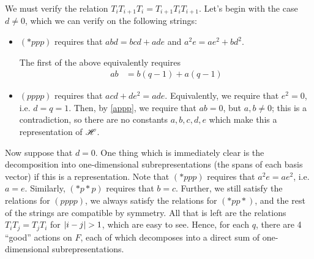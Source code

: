 \documentclass{amsart}
\begin{document}
We must verify the relation $T_iT_{i+1}T_i = T_{i+1}T_iT_{i+1}$.
Let's begin with the case $d \neq 0$, which we can verify on the following strings:
\begin{itemize}
  \item $(*ppp)$ requires that $abd = bcd + ade$ and $a^2e = ae^2 + bd^2$.

    The first of the above equivalently requires
    \begin{align}
      ab &= b(q-1) + a(q-1)
    \label{appp}
    \end{align}
  
    \item $(pppp)$ requires that $acd + de^2 = ade$.
     Equivalently, we require that $e^2 = 0$, i.e. $d = q = 1$.
     Then, by \eqref{appp}, we require that $ab = 0$, but $a,b \neq 0$;
     this is a contradiction, so there are no constants $a,b,c,d,e$ which make this a representation of $\mathscr{H}$.

     \iffalse
    These together imply that $a = b$, and that $a = 2(q-1)$;
     when $q \neq \frac{1}{2}, 2$ this contradicts \eqref{ab}.
  \item $(*p*p)$ requires that $b^2c = bc^2 + ad^2$ and $abd = bcd + ade$.
    Equivalently, we require that
    \begin{align}
      b^2(d^2-1) &= b(d^2-1)^2 + ad^2 \label{bq}\\
      ab &= b(q-1) + a(q - 1).\nonumber
    \end{align}
    In particular, we have that
    \[
      bd^4 + (a - 2b - b^2)d^2 + b - b^2 = 0 = ad^4 + (b - 2a)d^2 - a^2d + a. 
    \]
    Equivalently, $d$ is a root of the polynomial $(a-b)d^4 + (3b - 3a + b^2)d^2 - a^2d + (2b + b^2)$.
    \fi

\end{itemize}

Now suppose that $d = 0$.
One thing which is immediately clear is the decomposition into one-dimensional subrepresentations (the spans of each basis vector) if this is a representation.
Note that $(*ppp)$ requires that $a^2e = ae^2$, i.e. $a = e$.
Similarly, $(*p*p)$ requires that $b = c$.
Further, we still satisfy the relations for $(pppp)$, we always satisfy the relations for $(*pp*)$, and the rest of the strings are compatible by symmetry.
All that is left are the relations $T_iT_j = T_jT_i$ for $\left| i - j \right| > 1$, which are easy to see.
Hence, for each $q$, there are 4 ``good'' actions on $F$, each of which decomposes into a direct sum of one-dimensional subrepresentations.
\end{document}
